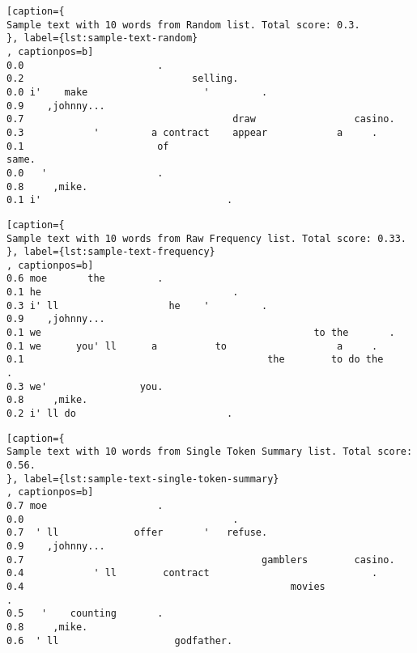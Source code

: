
\begin{lstlisting}[caption={
Sample text with 10 words from Random list. Total score: 0.3.
}, label={lst:sample-text-random}
, captionpos=b]
0.0	                      .
0.2	                            selling.
0.0	i'    make                    '         .
0.9	   ,johnny...
0.7	                                   draw                 casino.
0.3	           '         a contract    appear            a     .
0.1	                      of                                      same.
0.0	  '                   .
0.8	    ,mike.
0.1	i'                                .
\end{lstlisting}




\begin{lstlisting}[caption={
Sample text with 10 words from Raw Frequency list. Total score: 0.33.
}, label={lst:sample-text-frequency}
, captionpos=b]
0.6	moe       the         .
0.1	he                                 .
0.3	i' ll                   he    '         .
0.9	   ,johnny...
0.1	we                                               to the       .
0.1	we      you' ll      a          to                   a     .
0.1	                                         the        to do the     .
0.3	we'                you.
0.8	    ,mike.
0.2	i' ll do                          .
\end{lstlisting}




\begin{lstlisting}[caption={
Sample text with 10 words from Single Token Summary list. Total score: 0.56.
}, label={lst:sample-text-single-token-summary}
, captionpos=b]
0.7	moe                   .
0.0	                                   .
0.7	 ' ll             offer       '   refuse.
0.9	   ,johnny...
0.7	                                        gamblers        casino.
0.4	           ' ll        contract                            .
0.4	                                             movies               .
0.5	  '    counting       .
0.8	    ,mike.
0.6	 ' ll                    godfather.
\end{lstlisting}


